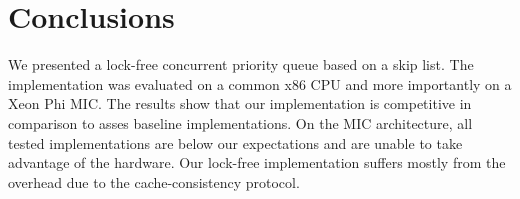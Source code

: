 \section{Conclusions}
\label{sec:con}
We presented a lock-free concurrent priority queue based on a skip list. The implementation was evaluated on a common x86 CPU and more importantly on a Xeon Phi MIC. The results show that our implementation is competitive in comparison to asses baseline implementations. On the MIC architecture, all tested implementations are below our expectations and are unable to take advantage of the hardware. Our lock-free implementation suffers mostly from the overhead due to the cache-consistency protocol.
